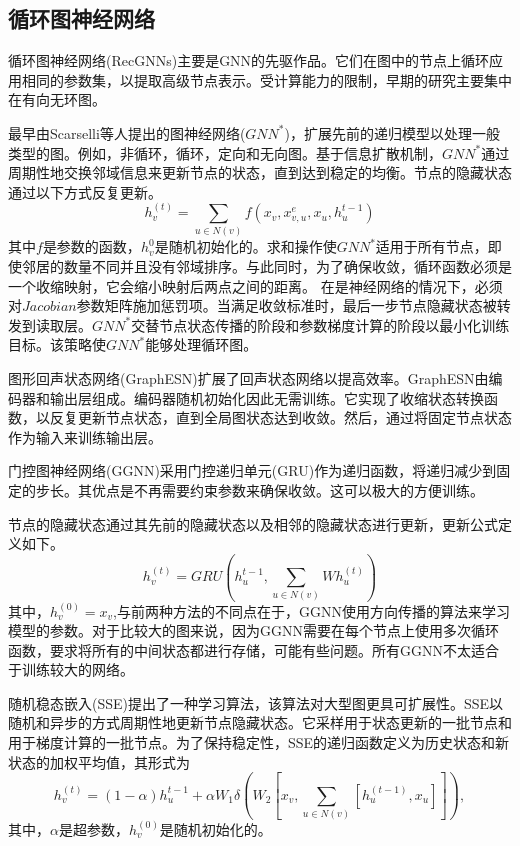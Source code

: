\subsection{循环图神经网络}
循环图神经网络(RecGNNs)主要是GNN的先驱作品。它们在图中的节点上循环应用相同的参数集，以提取高级节点表示。受计算能力的限制，早期的研究主要集中在有向无环图。

最早由Scarselli等人提出的图神经网络($GNN^*$)\cite{scarselli2008graph}，扩展先前的递归模型以处理一般类型的图。例如，非循环，循环，定向和无向图。基于信息扩散机制，$GNN^*$通过周期性地交换邻域信息来更新节点的状态，直到达到稳定的均衡。节点的隐藏状态通过以下方式反复更新。
\[
h_v^{(t)}=\sum_{u\in N(v)}f(x_v,x^e_{v,u},x_u,h_u^{t-1})
\]
其中$f$是参数的函数，$h_v^{0}$是随机初始化的。求和操作使$GNN^*$适用于所有节点，即使邻居的数量不同并且没有邻域排序。与此同时，为了确保收敛，循环函数必须是一个收缩映射，它会缩小映射后两点之间的距离。
在是神经网络的情况下，必须对$Jacobian$参数矩阵施加惩罚项。当满足收敛标准时，最后一步节点隐藏状态被转发到读取层。$GNN^*$交替节点状态传播的阶段和参数梯度计算的阶段以最小化训练目标。该策略使$GNN^*$能够处理循环图。

图形回声状态网络(GraphESN)扩展了回声状态网络以提高效率。GraphESN由编码器和输出层组成。编码器随机初始化因此无需训练。它实现了收缩状态转换函数，以反复更新节点状态，直到全局图状态达到收敛。然后，通过将固定节点状态作为输入来训练输出层。

门控图神经网络(GGNN)采用门控递归单元(GRU)作为递归函数，将递归减少到固定的步长。其优点是不再需要约束参数来确保收敛。这可以极大的方便训练。

节点的隐藏状态通过其先前的隐藏状态以及相邻的隐藏状态进行更新，更新公式定义如下。
\[
h_v^{(t)}=GRU(h_u^{t-1},\sum_{u\in N(v)} Wh_u^{(t)})
\]
其中，$h_v^{(0)}=x_v$,与前两种方法的不同点在于，GGNN使用方向传播的算法来学习模型的参数。对于比较大的图来说，因为GGNN需要在每个节点上使用多次循环函数，要求将所有的中间状态都进行存储，可能有些问题。所有GGNN不太适合于训练较大的网络。

随机稳态嵌入(SSE)提出了一种学习算法，该算法对大型图更具可扩展性。SSE以随机和异步的方式周期性地更新节点隐藏状态。它采样用于状态更新的一批节点和用于梯度计算的一批节点。为了保持稳定性，SSE的递归函数定义为历史状态和新状态的加权平均值，其形式为
\[
h_v^{(t)}=(1-\alpha)h_u^{t-1}+\alpha W_1\delta(W_2[x_v,\sum_{u\in N(v)}[h_u^{(t-1)},x_u]]) ,
\]
其中，$\alpha$是超参数，$h_v^{(0)}$是随机初始化的。
